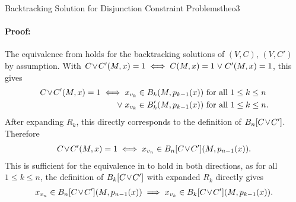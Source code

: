 \begin{theorem}{Backtracking Solution for Disjunction Constraint Problems}{theo3}
    \paragraph*{Proof:}
    The equivalence from  holds for the backtracking
    solutions of $(V,C)$, $(V,C')$ by assumption.
    With $C\hspace{-0.5mm}\lor\hspace{-0.5mm}C'(M,x)=1\iff C(M,x)=1\mathrel\lor C'(M,x)=1$,
    this gives
    \begin{align*}
        C\hspace{-0.5mm}\lor\hspace{-0.5mm}C'(M,x)=1\iff{}&x_{v_k}\in B_k(M,p_{k-1}(x))\text{ for all }1\leq k\leq n\\
                                            \mathrel\lor{}&x_{v_k}\in B'_k(M,p_{k-1}(x))\text{ for all }1\leq k\leq n.
    \end{align*}
    After expanding $R_k$, this directly corresponds to the definition of
    $B_n[C\hspace{-0.5mm}\lor\hspace{-0.5mm}C']$.
    Therefore
    \begin{align*}
        C\hspace{-0.5mm}\lor\hspace{-0.5mm}C'(M,x)=1\iff{}x_{v_n}\in B_n[C\hspace{-0.5mm}\lor\hspace{-0.5mm}C'](M,p_{n-1}(x)).
    \end{align*}
    This is sufficient for the equivalence in  to hold
    in both directions, as for all $1\leq k\leq n$, the definition of
    $B_k[C\hspace{-0.5mm}\lor\hspace{-0.5mm}C']$ with expanded $R_k$ directly
    gives
    \begin{align*}
        x_{v_n}\in B_n[C\hspace{-0.5mm}\lor\hspace{-0.5mm}C'](M,p_{n-1}(x))\implies x_{v_k}\in B_k[C\hspace{-0.5mm}\lor\hspace{-0.5mm}C'](M,p_{k-1}(x)).
    \end{align*}
\end{theorem}
